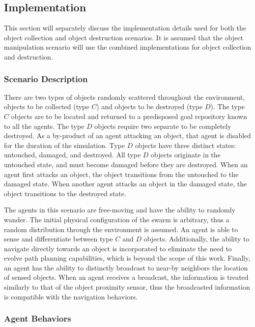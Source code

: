 \subsection{Implementation}

This section will separately discuss the implementation details used for both the object collection and object destruction scenarios.  It is assumed that the object manipulation scenario will use the combined implementations for object collection and destruction.

\subsubsection{Scenario Description}

There are two types of objects randomly scattered throughout the environment, objects to be collected (type $C$) and objects to be destroyed (type $D$).  The type $C$ objects are to be located and returned to a predisposed goal repository known to all the agents.  The type $D$ objects require two separate  to be completely destroyed.  As a by-product of an agent attacking an object, that agent is disabled for the duration of the simulation.  Type $D$ objects have three distinct states: untouched, damaged, and destroyed.  All type $D$ objects originate in the untouched state, and must become damaged before they are destroyed.  When an agent first attacks an object, the object transitions from the untouched to the damaged state.  When another agent attacks an object in the damaged state, the object transitions to the destroyed state.

The agents in this scenario are free-moving and have the ability to randomly wander.  The initial physical configuration of the swarm is arbitrary, thus a random distribution through the environment is assumed.  An agent is able to sense and differentiate between type $C$ and $D$ objects.  Additionally, the ability to navigate directly towards an object is incorporated to eliminate the need to evolve path planning capabilities, which is beyond the scope of this work.  Finally, an agent has the ability to distinctly broadcast to near-by neighbors the location of sensed objects.  When an agent receives a broadcast, the information is treated similarly to that of the object proximity sensor, thus the broadcasted information is compatible with the navigation behaviors.

\subsubsection{Agent Behaviors}

